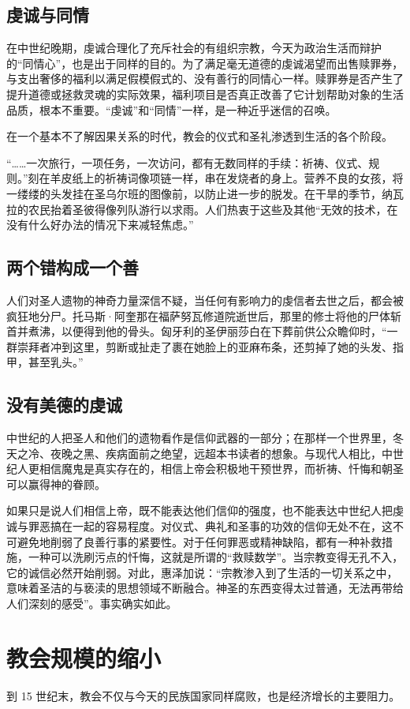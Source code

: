 \subsection{虔诚与同情}
在中世纪晚期，虔诚合理化了充斥社会的有组织宗教，今天为政治生活而辩护的“同情心”，也是出于同样的目的。为了满足毫无道德的虔诚渴望而出售赎罪券，与支出奢侈的福利以满足假模假式的、没有善行的同情心一样。赎罪券是否产生了提升道德或拯救灵魂的实际效果，福利项目是否真正改善了它计划帮助对象的生活品质，根本不重要。“虔诚”和“同情”一样，是一种近乎迷信的召唤。

在一个基本不了解因果关系的时代，教会的仪式和圣礼渗透到生活的各个阶段。

“……一次旅行，一项任务，一次访问，都有无数同样的手续：祈祷、仪式、规则。”刻在羊皮纸上的祈祷词像项链一样，串在发烧者的身上。营养不良的女孩，将一缕缕的头发挂在圣乌尔班的图像前，以防止进一步的脱发。在干旱的季节，纳瓦拉的农民抬着圣彼得像列队游行以求雨。人们热衷于这些及其他“无效的技术，在没有什么好办法的情况下来减轻焦虑。”

\subsection{两个错构成一个善}
人们对圣人遗物的神奇力量深信不疑，当任何有影响力的虔信者去世之后，都会被疯狂地分尸。托马斯·阿奎那在福萨努瓦修道院逝世后，那里的修士将他的尸体斩首并煮沸，以便得到他的骨头。匈牙利的圣伊丽莎白在下葬前供公众瞻仰时，“一群崇拜者冲到这里，剪断或扯走了裹在她脸上的亚麻布条，还剪掉了她的头发、指甲，甚至乳头。”

\subsection{没有美德的虔诚}
中世纪的人把圣人和他们的遗物看作是信仰武器的一部分；在那样一个世界里，冬天之冷、夜晚之黑、疾病面前之绝望，远超本书读者的想象。与现代人相比，中世纪人更相信魔鬼是真实存在的，相信上帝会积极地干预世界，而祈祷、忏悔和朝圣可以赢得神的眷顾。

如果只是说人们相信上帝，既不能表达他们信仰的强度，也不能表达中世纪人把虔诚与罪恶搞在一起的容易程度。对仪式、典礼和圣事的功效的信仰无处不在，这不可避免地削弱了良善行事的紧要性。对于任何罪恶或精神缺陷，都有一种补救措施，一种可以洗刷污点的忏悔，这就是所谓的“救赎数学”。当宗教变得无孔不入，它的诚信必然开始削弱。对此，惠泽加说：“宗教渗入到了生活的一切关系之中，意味着圣洁的与亵渎的思想领域不断融合。神圣的东西变得太过普通，无法再带给人们深刻的感受”。事实确实如此。

\section{教会规模的缩小}
到 15 世纪末，教会不仅与今天的民族国家同样腐败，也是经济增长的主要阻力。

